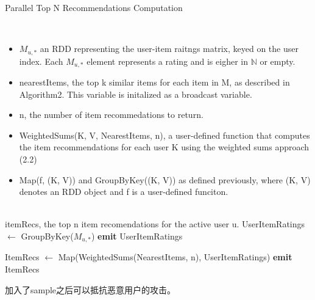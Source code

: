     \begin{algorithm}
    \caption{Parallel Top N Recommendations Computation}
    \begin{algorithmic}[1]
        \Require \\
        \begin{itemize}
            \item $M_{u, *}$ an RDD representing the user-item raitngs matrix, keyed on the user index. Each $M_{u, *}$ element represents a rating and is eigher in $\mathbb{N}$ or empty.
            \item nearestItems, the top k similar items for each item in M, as described in Algorithm2. This variable is initalized as a broadcast variable.
            \item n, the number of item recommedations to return.
            \item WeightedSums(K, V, NearestItems, n), a user-defined function that computes the item recommendations for each user K using the weighted sums approach (2.2)
            \item Map(f, (K, V)) and GroupByKey((K, V)) as defined previously, where (K, V) denotes an RDD object and f is a user-defined funciton.
        \end{itemize}
        \Ensure \\itemRecs, the top n item recomendations for the active user u.
            \State UserItemRatings $\leftarrow$ GroupByKey($M_{u, *}$)
            \State \textbf{emit} UserItemRatings
        \EndFunction
        
             \State ItemRecs $\leftarrow$ Map(WeightedSums(NearestItems, n), UserItemRatings)
            \State \textbf{emit} ItemRecs
        \EndFunction
    \end{algorithmic}
    
    \end{algorithm}
加入了sample之后可以抵抗恶意用户的攻击。